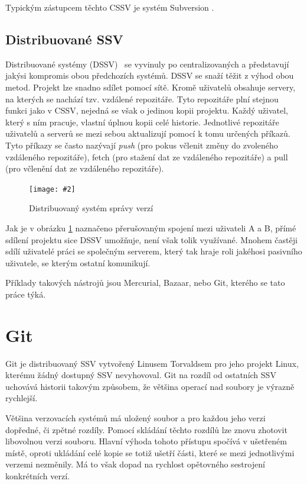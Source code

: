 \documentclass[
  biblatex,
  glossaries,
  index
]{kidiplom}
\newcommand{\pic}[4]{
\begin{figure}[h]
\centering
\texttt{[image: \#2]}
\caption{#3}
\label{fig:#4}
\end{figure}}
\begin{document}
Typickým zástupcem těchto CSSV je systém Subversion \cite{svn}.

\subsection{Distribuované SSV}
Distribuované systémy (DSSV)~\cite{otte} se vyvinuly po centralizovaných a představují 
jakýsi kompromis obou předchozích systémů. DSSV se snaží těžit z výhod obou 
metod. Projekt lze snadno sdílet pomocí sítě. Kromě uživatelů obsahuje 
servery, na kterých se nachází tzv. vzdálené repozitáře. Tyto repozitáře 
plní stejnou funkci jako v CSSV, nejedná se však o jedinou kopii projektu.
Každý uživatel, který s ním pracuje, vlastní úplnou kopii
celé historie. Jednotlivé repozitáře uživatelů a serverů se mezi sebou 		
aktualizují pomocí k tomu určených příkazů. Tyto příkazy se často nazývají
{\it push} (pro pokus včlenit změny do zvoleného vzdáleného repozitáře), fetch
(pro stažení dat ze vzdáleného repozitáře) a pull (pro včlenění dat ze 
vzdáleného repozitáře).

\pic{10cm}{distributed.png}{Distribuovaný systém správy verzí}{distributed}

Jak je v obrázku \ref{fig:distributed} \cite{gitreference} naznačeno přerušovaným spojení mezi uživateli A a B, přímé sdílení projektu sice DSSV umožňuje, není však tolik využívané. Mnohem častěji sdílí uživatelé práci se společným serverem, který tak hraje roli jakéhosi pasivního uživatele, se kterým ostatní komunikují.

Příklady takových nástrojů jsou Mercurial\cite{mercurial}, Bazaar\cite{bazaar}, nebo Git\cite{git}, kterého se
tato práce týká.

\section{Git}
Git je distribuovaný SSV vytvořený Linusem Torvaldsem pro jeho projekt Linux, kterému žádný dostupný SSV nevyhovoval. Git na rozdíl od ostatních SSV uchovává historii   takovým způsobem, že většina operací nad soubory je výrazně rychlejší.

Většina verzovacích systémů má uložený soubor a pro každou jeho verzi dopředné, či zpětné rozdíly. Pomocí skládání těchto rozdílů lze znovu zhotovit libovolnou verzi souboru. Hlavní výhoda tohoto přístupu spočívá v ušetřeném místě, oproti ukládání celé kopie se totiž ušetří části, které se mezi jednotlivými verzemi nezměnily. Má to však dopad na rychlost opětovného sestrojení  konkrétních verzí.
\end{document}
